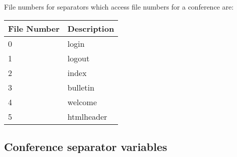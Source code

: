\documentclass[twoside]{report}
\begin{document}
         File numbers for separators which access file numbers for a 
         conference are:


         \begin{tabular}{ll}
            File Number & Description \\ \hline

            0           & login \\
            1           & logout \\
            2           & index \\
            3           & bulletin \\
            4           & welcome \\
            5           & htmlheader \\
         \end{tabular}

\vspace{12pt}


      \subsection{Conference separator variables}
\end{document}
